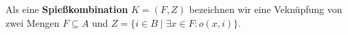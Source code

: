 \begin{definition}[Spießkombination]\label{def:spiesskomb}
Als eine \textbf{Spießkombination} $K = (F, Z)$ bezeichnen wir eine Veknüpfung von zwei Mengen 
$F \subseteq A$ und $Z = \{i \in B \mid \exists x \in F : o(x, i)\}.$
\end{definition}
